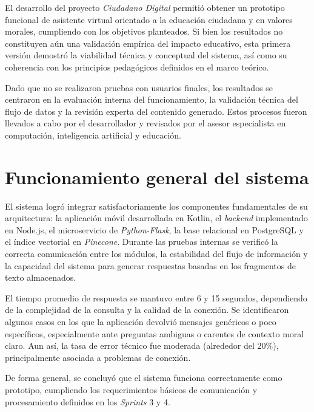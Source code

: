 El desarrollo del proyecto \textit{Ciudadano Digital} permitió obtener un prototipo
funcional de asistente virtual orientado a la educación ciudadana y en valores
morales, cumpliendo con los objetivos planteados. Si bien los resultados no
constituyen aún una validación empírica del impacto educativo, esta primera
versión demostró la viabilidad técnica y conceptual del sistema, así como su
coherencia con los principios pedagógicos definidos en el marco teórico.

Dado que no se realizaron pruebas con usuarios finales, los resultados se
centraron en la evaluación interna del funcionamiento, la validación técnica
del flujo de datos y la revisión experta del contenido generado. Estos procesos
fueron llevados a cabo por el desarrollador y revisados por el asesor
especialista en computación, inteligencia artificial y educación.

\section{Funcionamiento general del sistema}
El sistema logró integrar satisfactoriamente los componentes fundamentales de
su arquitectura: la aplicación móvil desarrollada en Kotlin, el
\textit{backend} implementado en Node.js, el microservicio de
\textit{Python}-\textit{Flask}, la base relacional en PostgreSQL y el índice
vectorial en \textit{Pinecone}. Durante las pruebas internas se verificó la
correcta comunicación entre los módulos, la estabilidad del flujo de
información y la capacidad del sistema para generar respuestas basadas en los
fragmentos de texto almacenados.

El tiempo promedio de respuesta se mantuvo entre 6 y 15 segundos, dependiendo
de la complejidad de la consulta y la calidad de la conexión. Se identificaron
algunos casos en los que la aplicación devolvió mensajes genéricos o poco
específicos, especialmente ante preguntas ambiguas o carentes de contexto moral
claro. Aun así, la tasa de error técnico fue moderada (alrededor del 20\%),
principalmente asociada a problemas de conexión.

De forma general, se concluyó que el sistema funciona correctamente como
prototipo, cumpliendo los requerimientos básicos de comunicación y
procesamiento definidos en los \textit{Sprints} 3 y 4.

